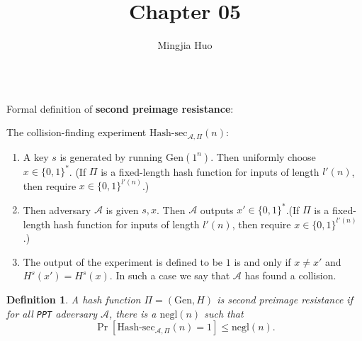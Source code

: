 \documentclass[a4paper]{article}
\newtheorem{definition}{Definition}
\newcommand{\negl}{\text{negl}}
\newcommand{\Gen}{\text{Gen}}
\newcommand{\hashsec}{\text{Hash-sec}}
\newcommand{\A}{\mathcal{A}}
\newenvironment{problem}[2][Problem]{\begin{trivlist}
\item[\hskip \labelsep {\bfseries #1}\hskip \labelsep {\bfseries #2.}]}{\end{trivlist}}
\begin{document}
 
\title{Chapter 05}
\author{Mingjia Huo}
\date{}
\maketitle

\begin{problem}{5.1}
$ $\par
Formal definition of \textbf{second preimage resistance}:\par
The collision-finding experiment $\hashsec_{\A,\Pi}(n)$:\par\begin{enumerate}
    \item A key $s$ is generated by running $\Gen(1^n)$. Then uniformly choose $x\in\{0,1\}^*$. (If $\Pi$ is a fixed-length hash function for inputs of length $l'(n)$, then require $x\in\{0,1\}^{l'(n)}$.)
    \item Then adversary $\A$ is given $s,x$. Then $\A$ outputs $x'\in\{0,1\}^*$.(If $\Pi$ is a fixed-length hash function for inputs of length $l'(n)$, then require $x\in\{0,1\}^{l'(n)}$.)
    \item The output of the experiment is defined to be $1$ is and only if $x\ne x'$ and $H^s(x')=H^s(x)$. In such a case we say that $\A$ has found a collision.
    \end{enumerate}
    \begin{definition}
    A hash function $\Pi=(\Gen,H)$ is second preimage resistance if for all \texttt{PPT} adversary $\A$, there is a $\negl(n)$ such that \[\Pr[\hashsec_{\A,\Pi}(n)=1]\le\negl(n).\]
    \end{definition}\par\vspace{3ex}
    

\end{problem}
\end{document}
